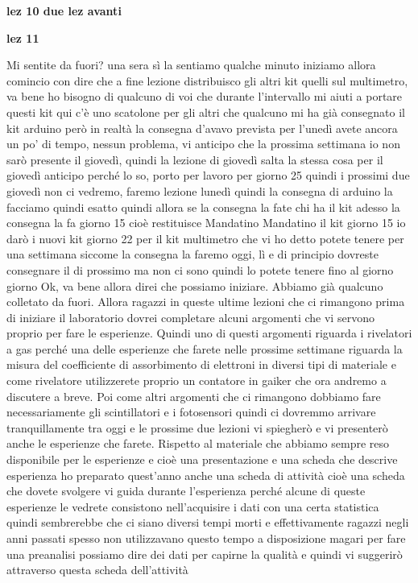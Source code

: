 \large \textbf{lez 10 due lez avanti}

\normalsize

\textbf{lez 11}

Mi sentite da fuori? una sera sì la sentiamo qualche minuto iniziamo allora comincio con dire che a fine lezione distribuisco gli altri kit quelli sul multimetro, va bene ho bisogno di qualcuno di voi che durante l'intervallo mi aiuti a portare questi kit qui c'è uno scatolone per gli altri che qualcuno mi ha già consegnato il kit arduino però in realtà la consegna d'avavo prevista per l'unedì avete ancora un po' di tempo, nessun problema, vi anticipo che la prossima settimana io non sarò presente il giovedì, quindi la lezione di giovedì salta la stessa cosa per il giovedì anticipo perché lo so, porto per lavoro per giorno 25 quindi i prossimi due giovedì non ci vedremo, faremo lezione lunedì quindi la consegna di arduino la facciamo quindi esatto quindi allora se la consegna la fate chi ha il kit adesso la consegna la fa giorno 15 cioè restituisce Mandatino Mandatino il kit giorno 15 io darò i nuovi kit giorno 22 per il kit multimetro che vi ho detto potete tenere per una settimana siccome la consegna la faremo oggi, lì e di principio dovreste consegnare il di prossimo ma non ci sono quindi lo potete tenere fino al giorno giorno Ok, va bene allora direi che possiamo iniziare. Abbiamo già qualcuno colletato da fuori. Allora ragazzi in queste ultime lezioni che ci rimangono prima di iniziare il laboratorio dovrei completare alcuni argomenti che vi servono proprio per fare le esperienze. Quindi uno di questi argomenti riguarda i rivelatori a gas perché una delle esperienze che farete nelle prossime settimane riguarda la misura del coefficiente di assorbimento di elettroni in diversi tipi di materiale e come rivelatore utilizzerete proprio un contatore in gaiker che ora andremo a discutere a breve. Poi come altri argomenti che ci rimangono dobbiamo fare necessariamente gli scintillatori e i fotosensori quindi ci dovremmo arrivare tranquillamente tra oggi e le prossime due lezioni vi spiegherò e vi presenterò anche le esperienze che farete. Rispetto al materiale che abbiamo sempre reso disponibile per le esperienze e cioè una presentazione e una scheda che descrive esperienza ho preparato quest'anno anche una scheda di attività cioè una scheda che dovete svolgere vi guida durante l'esperienza perché alcune di queste esperienze le vedrete consistono nell'acquisire i dati con una certa statistica quindi sembrerebbe che ci siano diversi tempi morti e effettivamente ragazzi negli anni passati spesso non utilizzavano questo tempo a disposizione magari per fare una preanalisi possiamo dire dei dati per capirne la qualità e quindi vi suggerirò attraverso questa scheda dell'attività 

